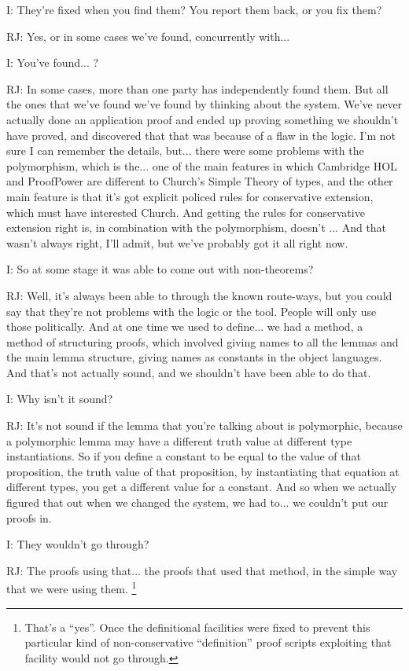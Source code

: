 \documentclass[10pt,titlepage]{book}
\begin{document}
I: They're fixed when you find them?
You report them back, or you fix them?

RJ: Yes, or in some cases we've found, concurrently with...

I: You've found... ?

RJ: In some cases, more than one party has independently found them.
But all the ones that we've found we've found by thinking about the system.
We've never actually done an application proof and ended up proving something we shouldn't have proved, and discovered that that was because of a flaw in the logic.
I'm not sure I can remember the details, but... there were some problems with the polymorphism, which is the... one of the main features in which Cambridge HOL and ProofPower are different to Church's Simple Theory of types, and the other main feature is that it's got explicit policed rules for conservative extension, which must have interested Church.
And getting the rules for conservative extension right is, in combination with the polymorphism, doesn't ...
And that wasn't always right, I'll admit, but we've probably got it all right now.

I: So at some stage it was able to come out with non-theorems?

RJ: Well, it's always been able to through the known route-ways, but you could say that they're not problems with the logic or the tool.
People will only use those politically.
And at one time we used to define... we had a method, a method of structuring proofs, which involved giving names to all the lemmas and the main lemma structure, giving names as constants in the object languages.
And that's not actually sound, and we shouldn't have been able to do that.

I: Why isn't it sound?

RJ: It's not sound if the lemma that you're talking about is polymorphic, because a polymorphic lemma may have a different truth value at different type instantiations.
So if you define a constant to be equal to the value of that proposition, the truth value of that proposition, by instantiating that equation at different types, you get a different value for a constant.
And so when we actually figured that out when we changed the system, we had to... we couldn't put our proofs in.

I: They wouldn't go through?

RJ: The proofs using that... the proofs that used that method, in the simple way that we were using them.%
\footnote{
That's a ``yes''.
Once the definitional facilities were fixed to prevent this particular kind of non-conservative ``definition'' proof scripts exploiting that facility would not go through. 
}%
\end{document}
